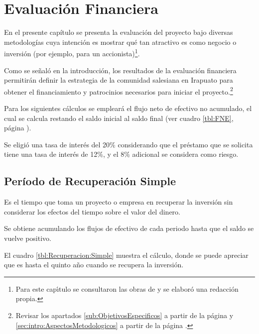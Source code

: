\chapter{Evaluación Financiera}
\label{cap:Evaluacion:Financiera}

En el presente capítulo se presenta la evaluación del proyecto bajo diversas metodologías cuya intención es mostrar qué tan atractivo es como negocio o inversión (por ejemplo, para un accionista)\footnote{Para este cap\'{\i}tulo se consultaron las obras de \citep{Conant2004, COSS2000, SAPAG2007, Leland2006} y se elabor\'{o} una redacción propia.}.


Como se señaló en la introducción, los resultados de la evaluación financiera permitirán definir la estrategia de la comunidad salesiana en Irapuato para obtener el financiamiento y patrocinios necesarios para iniciar el proyecto.\footnote{Revisar los apartados \ref{sub:ObjetivosEspecificos} a partir de la página \pageref{sub:ObjetivosEspecificos} y \ref{sec:intro:AspectosMetodologicos} a partir de la página \pageref{sec:intro:AspectosMetodologicos}.}

Para los siguientes cálculos se empleará el flujo neto de efectivo no acumulado, el cual se calcula restando el saldo inicial al saldo final (ver cuadro \ref{tbl:FNE}, página \pageref{tbl:FNE}).

Se eligió una tasa de interés del 20\% considerando que el préstamo que se solicita tiene una tasa de interés de 12\%, y el 8\% adicional se considera como riesgo.

\section{Período de Recuperación Simple}

Es el tiempo que toma un proyecto o empresa en recuperar la inversión sin considerar los efectos del tiempo sobre el valor del dinero.

Se obtiene acumulando los flujos de efectivo de cada periodo hasta que el saldo se vuelve positivo.

El cuadro \ref{tbl:Recuperacion:Simple} muestra el cálculo, donde se puede apreciar que es hasta el quinto año cuando se recupera la inversión.

